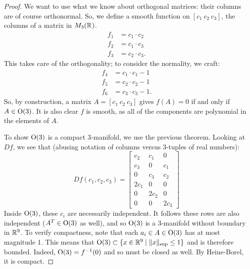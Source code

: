 \documentclass{article}
\begin{document}
\begin{proof}
  We want to use what we know about orthogonal matrices: their columns are of course orthonormal.
  So, we define a smooth function on $[c_{1}\ c_{2}\ c_{3}]$, the columns of a matrix in $M_{3}(\RR)$.
  \begin{align*}
    f_{1} &= c_{1} \cdot c_{2}\\
    f_{2} &= c_{1} \cdot c_{3}\\
    f_{3} &= c_{2} \cdot c_{3}.
  \end{align*}
  This takes care of the orthogonality; to consider the normality, we craft:
  \begin{align*}
    f_{4} &= c_{1} \cdot c_{1} - 1\\
    f_{5} &= c_{2} \cdot c_{2} - 1\\
    f_{6} &= c_{3} \cdot c_{3} - 1.
  \end{align*}
  So, by construction, a matrix $A = [c_{1}\ c_{2}\ c_{3}]$ gives $f(A) = 0$ if and only if $A \in \Orth(3)$.
  It is also clear $f$ is smooth, as all of the components are polynomial in the elements of $A$.

  To show $\Orth(3)$ is a compact 3-manifold, we use the previous theorem.
  Looking at $Df$, we see that (abusing notation of columns versus 3-tuples of real numbers):
  \begin{equation*}
    Df(c_{1}, c_{2}, c_{3}) = \begin{bmatrix}
      c_{2} & c_{1} & 0\\
      c_{3} & 0 & c_{1}\\
      0 & c_{3} & c_{2}\\
      2c_{1} & 0 & 0\\
      0 & 2c_{2} & 0\\
      0 & 0 & 2c_{3}
    \end{bmatrix}
  \end{equation*}
  Inside $\Orth(3)$, these $c_{i}$ are necessarily independent.
  It follows these rows are also independent ($A^{T} \in \Orth(3)$ as well),
  and so $\Orth(3)$ is a 3-manifold without boundary in $\RR[9]$.
  To verify compactness, note that each $a_{i} \in A \in \Orth(3)$ has at most magnitude 1.
  This means that $\Orth(3) \subset \set{ x \in \RR[9] \mid \norm{x}_{\sup} \le 1 }$ and is therefore bounded.
  Indeed, $\Orth(3) = f\inv(0)$ and so must be closed as well. By Heine-Borel, it is compact.
\end{proof}
\end{document}
